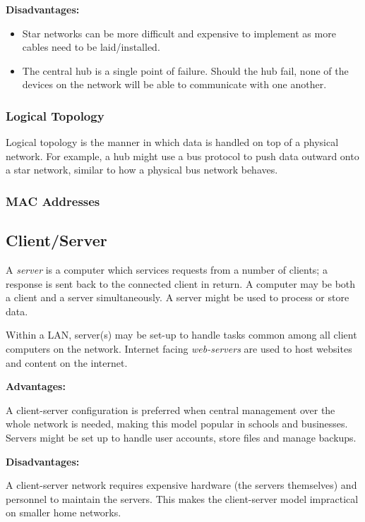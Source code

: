 \documentclass[9pt]{article}
\begin{document}
\textbf{Disadvantages:}

\begin{itemize}
\item Star networks can be more difficult and expensive to implement as more cables need to be laid/installed.
\item The central hub is a single point of failure. Should the hub fail, none of the devices on the network will be able to communicate with one another.
\end{itemize}

\subsubsection{Logical Topology}
\label{sec:org9851270}

Logical topology is the manner in which data is handled on top of a physical network. For example, a hub might use a bus protocol to push data outward onto a star network, similar to how a physical bus network behaves.

\subsubsection{MAC Addresses}
\label{sec:orgf018ddc}
\subsection{Client/Server}
\label{sec:org66ca71a}

A \emph{server} is a computer which services requests from a number of clients; a response is sent back to the connected client in return. A computer may be both a client and a server simultaneously. A server might be used to process or store data.

Within a LAN, server(s) may be set-up to handle tasks common among all client computers on the network. Internet facing \emph{web-servers} are used to host websites and content on the internet.

\textbf{Advantages:}

A client-server configuration is preferred when central management over the whole network is needed, making this model popular in schools and businesses. Servers might be set up to handle user accounts, store files and manage backups.

\textbf{Disadvantages:}

A client-server network requires expensive hardware (the servers themselves) and personnel to maintain the servers. This makes the client-server model impractical on smaller home networks.
\end{document}
